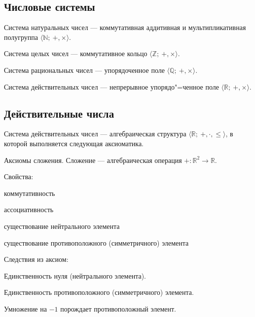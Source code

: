 \subsection{Числовые системы}

{\bold Система натуральных чисел} --- коммутативная аддитивная и мультипликативная полугруппа $\langle\mathbb{N};\ +,\times\rangle$.\par

{\bold Система целых чисел} --- коммутативное кольцо $\langle\mathbb{Z};\ +,\times\rangle$.
\par

{\bold Система рациональных чисел} --- упорядоченное поле $\langle\mathbb{Q};\ +,\times
\rangle$.\par

{\bold Система действительных чисел} --- непрерывное упорядо"=ченное поле $\langle\mathbb
{R};\ +,\times\rangle$.

\subsection{Действительные числа}

{\bold Система действительных чисел} --- алгебраическая структура $\langle\mathbb{R};\ +,\cdot,\leq\rangle$, в которой выполняется следующая {\ital аксиоматика}.
\begin{theorem}
{\bold Аксиомы сложения.} {\ital Сложение} --- алгебраическая операция $+\colon\mathbb{R}^2\to\mathbb{R}$.

Свойства:
\begin{list*}[][\#]
\item коммутативность
\item ассоциативность
\item существование нейтрального элемента
\item существование противоположного {\ital (симметричного)} элемента
\end{list*}
Следствия из аксиом:
\begin{list*}[][\#]
\item Единственность нуля {\ital (нейтрального элемента)}.
\item Единственность противоположного {\ital (симметричного)} элемента.
\item Умножение на $-1$ порождает противоположный элемент.
\end{list*}
\end{theorem}

